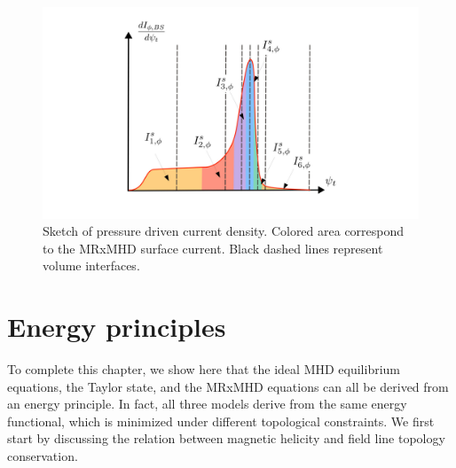 \documentclass[my_thesis.tex]{subfiles}
\begin{document}
\begin{figure}
    \centering
    \includegraphics[width=\linewidth]{main/Figures_CurrentConstraint/ABaillod_fig4.pdf}
    \caption{Sketch of pressure driven current density. Colored area correspond to the \ac{MRxMHD} surface current. Black dashed lines represent volume interfaces.}
    \label{fig:sketch_bootstrap}
\end{figure}







\section{Energy principles}
To complete this chapter, we show here that the ideal MHD equilibrium equations, the Taylor state, and the MRxMHD equations can all be derived from an energy principle. In fact, all three models derive from the same energy functional, which is minimized under different topological constraints. We first start by discussing the relation between magnetic helicity and field line topology conservation.

\end{document}
